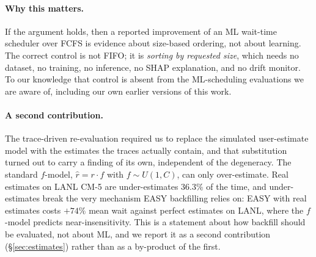 \documentclass[11pt,twocolumn]{article}
\begin{document}
\paragraph{Why this matters.}
If the argument holds, then a reported improvement of an ML wait-time scheduler
over FCFS is evidence about size-based ordering, not about learning. The correct
control is not FIFO; it is \emph{sorting by requested size}, which needs no
dataset, no training, no inference, no SHAP explanation, and no drift monitor.
To our knowledge that control is absent from the ML-scheduling evaluations we
are aware of, including our own earlier versions of this work.

\paragraph{A second contribution.}
The trace-driven re-evaluation required us to replace the simulated
user-estimate model with the estimates the traces actually contain, and that
substitution turned out to carry a finding of its own, independent of the
degeneracy. The standard $f$-model, $\hat r = r\cdot f$ with $f \sim U(1,C)$,
can only over-estimate. Real estimates on LANL CM-5 are under-estimates
$36.3\%$ of the time, and under-estimates break the very mechanism EASY
backfilling relies on: EASY with real estimates costs $+74\%$ mean wait against
perfect estimates on LANL, where the $f$-model predicts near-insensitivity.
This is a statement about how backfill should be evaluated, not about ML, and we
report it as a second contribution (\S\ref{sec:estimates}) rather than as a
by-product of the first.
\end{document}
